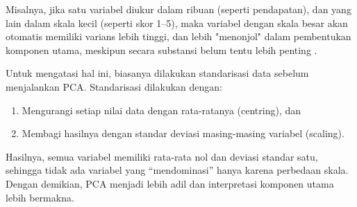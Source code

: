 \begin{itemize}
	      Misalnya, jika satu variabel diukur dalam ribuan (seperti pendapatan), dan yang lain dalam skala kecil (seperti skor 1–5), maka variabel dengan skala besar akan otomatis memiliki varians lebih tinggi, dan lebih "menonjol" dalam pembentukan komponen utama, meskipun secara substansi belum tentu lebih penting \textcite{Jolliffe2016}.

	      Untuk mengatasi hal ini, biasanya dilakukan standarisasi data sebelum menjalankan PCA. Standarisasi dilakukan dengan:
	      \begin{enumerate}
		      \item Mengurangi setiap nilai data dengan rata-ratanya (centring), dan
		      \item Membagi hasilnya dengan standar deviasi masing-masing variabel (scaling).
	      \end{enumerate}
	      Hasilnya, semua variabel memiliki rata-rata nol dan deviasi standar satu, sehingga tidak ada variabel yang “mendominasi” hanya karena perbedaan skala. Dengan demikian, PCA menjadi lebih adil dan interpretasi komponen utama lebih bermakna.
\end{itemize}
